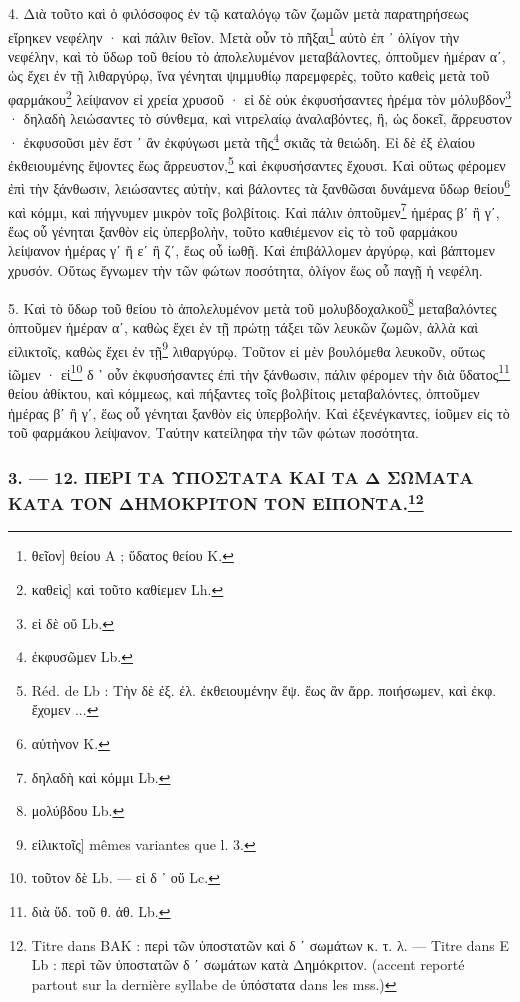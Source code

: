\documentclass[a4paper, 11pt, oneside, polutonikogreek, french]{article}
\begin{document}
4. Διὰ τοῦτο καὶ ὁ φιλόσοφος ἐν τῷ καταλόγῳ τῶν ζωμῶν μετὰ παρατηρήσεως εἴρηκεν νεφέλην · καὶ πάλιν θεῖον. Μετὰ οὖν τὸ πῆξαι\footnote{θεῖον] θείου A ; ὕδατος θείου K.} αὐτὸ ἐπ ᾽ ὀλίγον τὴν νεφέλην, καὶ τὸ ὕδωρ τοῦ θείου τὸ ἀπολελυμένον μεταβάλοντες, ὀπτοῦμεν ἡμέραν αʹ, ὡς ἔχει ἐν τῇ λιθαργύρῳ, ἵνα γένηται ψιμμυθίῳ παρεμφερὲς, τοῦτο καθεὶς μετὰ τοῦ φαρμάκου\footnote{καθεὶς] καὶ τοῦτο καθίεμεν Lh.} λείψανον εἰ χρεία χρυσοῦ · εἰ δὲ οὐκ ἐκφυσήσαντες ἠρέμα τὸν μόλυβδον\footnote{εἰ δὲ οὔ Lb.} · δηλαδὴ λειώσαντες τὸ σύνθεμα, καὶ νιτρελαίῳ ἀναλαβόντες, ἢ, ὡς δοκεῖ, ἄρρευστον · ἐκφυσοῦσι μὲν ἔστ ᾽ ἂν ἐκφύγωσι μετὰ τῆς\footnote{ἐκφυσῶμεν Lb.} σκιᾶς τὰ θειώδη. Εἰ δὲ ἐξ ἐλαίου ἐκθειουμένης ἕψοντες ἕως ἄρρευστον,\footnote{Réd. de Lb : Τὴν δὲ ἐξ. ἐλ. ἐκθειουμένην ἕψ. ἕως ἂν ἄρρ. ποιήσωμεν, καὶ ἐκφ. ἔχομεν ...} καὶ ἐκφυσήσαντες ἔχουσι. Καὶ οὕτως φέρομεν ἐπὶ τὴν ξάνθωσιν, λειώσαντες αὐτὴν, καὶ βάλοντες τὰ ξανθῶσαι δυνάμενα ὕδωρ θείου\footnote{αὐτὴνον K.} καὶ κόμμι, καὶ πήγνυμεν μικρὸν τοῖς βολβίτοις. Καὶ πάλιν ὀπτοῦμεν\footnote{δηλαδὴ καὶ κόμμι Lb.} ἡμέρας βʹ ἢ γʹ, ἕως οὗ γένηται ξανθὸν εἰς ὑπερβολὴν, τοῦτο καθιέμενον εἰς τὸ τοῦ φαρμάκου λείψανον ἡμέρας γʹ ἢ εʹ ἢ ζʹ, ἕως οὗ ἰωθῇ. Καὶ ἐπιβάλλομεν ἀργύρῳ, καὶ βάπτομεν χρυσόν. Οὕτως ἔγνωμεν τὴν τῶν φώτων ποσότητα, ὀλίγον ἕως οὗ παγῇ ἡ νεφέλη.

5. Καὶ τὸ ὕδωρ τοῦ θείου τὸ ἀπολελυμένον μετὰ τοῦ μολυβδοχαλκοῦ\footnote{μολύβδου Lb.} μεταβαλόντες ὀπτοῦμεν ἡμέραν αʹ, καθὼς ἔχει ἐν τῇ πρώτῃ τάξει τῶν λευκῶν ζωμῶν, ἀλλὰ καὶ εἱλικτοῖς, καθὼς ἔχει ἐν τῇ\footnote{εἱλικτοῖς] mêmes variantes que l. 3.} λιθαργύρῳ. Τοῦτον εἰ μὲν βουλόμεθα λευκοῦν, οὕτως ἰῶμεν · εἰ\footnote{τοῦτον δὲ Lb. --- εἰ δ ᾽ οὔ Lc.} δ ᾽ οὖν ἐκφυσήσαντες ἐπὶ τὴν ξάνθωσιν, πάλιν φέρομεν τὴν διὰ ὕδατος\footnote{διὰ ὕδ. τοῦ θ. ἀθ. Lb.} θείου ἀθίκτου, καὶ κόμμεως, καὶ πήξαντες τοῖς βολβίτοις μεταβαλόντες, ὀπτοῦμεν ἡμέρας βʹ ἢ γʹ, ἕως οὗ γένηται ξανθὸν εἰς ὑπερβολήν. Καὶ ἐξενέγκαντες, ἰοῦμεν εἰς τὸ τοῦ φαρμάκου λείψανον. Ταύτην κατείληφα τὴν τῶν φώτων ποσότητα.

\bigskip
\centerline{\EightStarTaper}
\centerline{\EightStarTaper\EightStarTaper}
\bigskip

\subsubsection[3. --- 12. ΠΕΡΙ ΤΑ ΥΠΟΣΤΑΤΑ ΚΑΙ ΤΑ Δ ΣΩΜΑΤΑ ΚΑΤΑ ΤΟΝ ΔΗΜΟΚΡΙΤΟΝ ΤΟΝ ΕΙΠΟΝΤΑ.]{3. --- 12. ΠΕΡΙ ΤΑ ΥΠΟΣΤΑΤΑ ΚΑΙ ΤΑ Δ ΣΩΜΑΤΑ ΚΑΤΑ ΤΟΝ ΔΗΜΟΚΡΙΤΟΝ ΤΟΝ ΕΙΠΟΝΤΑ.\footnote{Titre dans BAK : περὶ τῶν ὑποστατῶν καὶ δ ʹ σωμάτων κ. τ. λ. --- Titre dans E Lb : περὶ τῶν ὑποστατῶν δ ʹ σωμάτων κατὰ Δημόκριτον. (accent reporté partout sur la dernière syllabe de ὑπόστατα dans les mss.)}}
\end{document}
